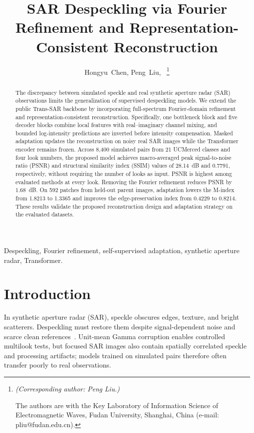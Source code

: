 \documentclass[journal]{IEEEtran}
\begin{document}
\title{SAR Despeckling via Fourier Refinement and
Representation-Consistent Reconstruction}

\author{Hongyu~Chen, Peng~Liu,~%
\thanks{\raggedright\emph{(Corresponding author: Peng Liu.)}\par
The authors are with the Key Laboratory of Information Science of Electromagnetic Waves, Fudan University, Shanghai, China (e-mail: \mbox{pliu@fudan.edu.cn}).}}

\maketitle

\begin{abstract}
The discrepancy between simulated speckle and real synthetic aperture radar (SAR) observations limits the generalization of supervised despeckling models. We extend the public Trans-SAR backbone by incorporating full-spectrum Fourier-domain refinement and representation-consistent reconstruction. Specifically, one bottleneck block and five decoder blocks combine local features with real--imaginary channel mixing, and bounded log-intensity predictions are inverted before intensity compensation. Masked adaptation updates the reconstruction on noisy real SAR images while the Transformer encoder remains frozen. Across 8,400 simulated pairs from 21 UCMerced classes and four look numbers, the proposed model achieves macro-averaged peak signal-to-noise ratio (PSNR) and structural similarity index (SSIM) values of 28.14~dB and 0.7791, respectively, without requiring the number of looks as input. PSNR is highest among evaluated methods at every look. Removing the Fourier refinement reduces PSNR by 1.68~dB. On 592 patches from held-out parent images, adaptation lowers the M-index from 1.8213 to 1.3365 and improves the edge-preservation index from 0.4229 to 0.8214. These results validate the proposed reconstruction design and adaptation strategy on the evaluated datasets.
\end{abstract}

\begin{IEEEkeywords}
Despeckling, Fourier refinement, self-supervised adaptation, synthetic aperture radar, Transformer.
\end{IEEEkeywords}

\section{Introduction}
In synthetic aperture radar (SAR), speckle obscures edges, texture, and bright scatterers. Despeckling must restore them despite signal-dependent noise and scarce clean references~\cite{fracastoro2021overview}. Unit-mean Gamma corruption enables controlled multilook tests, but focused SAR images also contain spatially correlated speckle and processing artifacts; models trained on simulated pairs therefore often transfer poorly to real observations.
\end{document}
